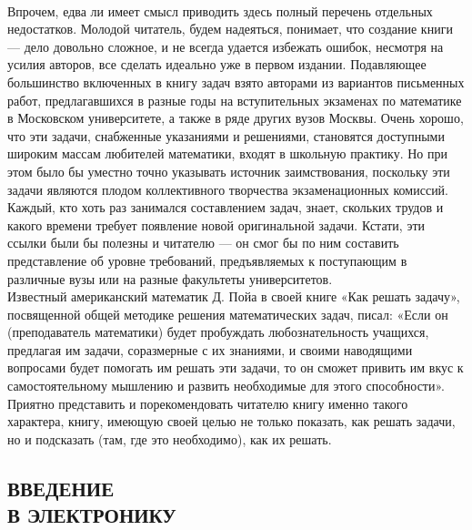 \begin{multicols}{3}
\\Впрочем, едва ли имеет смысл приводить здесь полный перечень отдельных недостатков. Молодой читатель, будем надеяться, понимает, что создание книги — дело довольно сложное, и не всегда удается избежать ошибок, несмотря на усилия авторов, все сделать идеально уже в первом издании. Подавляющее большинство включенных в книгу задач взято авторами из вариантов письменных работ, предлагавшихся в разные годы на вступительных экзаменах по математике в Московском университете, а также в ряде других вузов Москвы. Очень хорошо, что эти задачи, снабженные указаниями и решениями, становятся доступными широким массам любителей математики, входят в школьную практику. Но при этом было бы уместно точно указывать источник заимствования, поскольку эти задачи являются плодом коллективного творчества экзаменационных комиссий. Каждый, кто хоть раз занимался составлением задач, знает, скольких трудов и какого времени требует появление новой оригинальной задачи. Кстати, эти ссылки были бы полезны и читателю — он смог бы по ним составить представление об уровне требований, предъявляемых к поступающим в различные вузы или на разные факультеты университетов.\\Известный американский математик Д. Пойа в своей книге «Как решать задачу», посвященной общей методике решения математических задач, писал: «Если он (преподаватель математики) будет пробуждать любознательность учащихся, предлагая им задачи, соразмерные с их знаниями, и своими наводящими вопросами будет помогать им решать эти задачи, то он сможет привить им вкус к самостоятельному мышлению и развить необходимые для этого способности». Приятно представить и порекомендовать читателю книгу именно такого характера, книгу, имеющую своей целью не только показать, как решать задачи, но и подсказать (там, где это необходимо), как их решать.
\columnbreak
\subsection*{ВВЕДЕНИЕ \\В ЭЛЕКТРОНИКУ}


\end{multicols}
